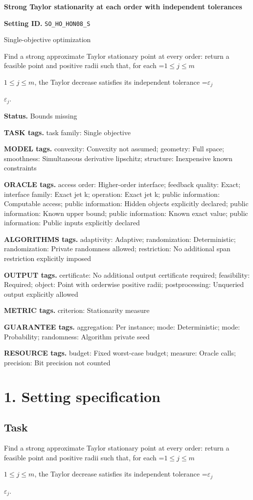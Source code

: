 \documentclass[10pt,a4paper]{article}
\newcommand{\AtlasMath}[1]{\par\begingroup\centering\setbox0=\hbox{$\displaystyle #1$}\ifdim\wd0>1.4\linewidth\typeout{ATLAS WIDE FORMULA: \the\wd0}\fi\ifdim\wd0>\linewidth\resizebox{\linewidth}{!}{\box0}\else\box0\fi\par\endgroup}
\newcommand{\AtlasInlineMath}[1]{\begingroup\setbox0=\hbox{$#1$}\ifdim\wd0>.4\linewidth\endgroup\AtlasMath{#1}\else\endgroup$#1$\fi}
\begin{document}
\raggedright

{\LARGE\bfseries\sffamily\color{AtlasNavy} Strong Taylor stationarity at each order with independent tolerances\par}\vspace{5pt}
\textbf{Setting ID.} \texttt{SO\_\allowbreak{}HO\_\allowbreak{}HON08\_\allowbreak{}S}

Single-objective optimization

Find a strong approximate Taylor stationary point at every order: return a feasible point and positive radii such that, for each \AtlasInlineMath{1\le j\le m}, the Taylor decrease satisfies its independent tolerance \AtlasInlineMath{\varepsilon_j}.

\textbf{Status.} Bounds missing

\textbf{TASK tags.} task family: Single objective

\textbf{MODEL tags.} convexity: Convexity not assumed; geometry: Full space; smoothness: Simultaneous derivative lipschitz; structure: Inexpensive known constraints

\textbf{ORACLE tags.} access order: Higher-order interface; feedback quality: Exact; interface family: Exact jet k; operation: Exact jet k; public information: Computable access; public information: Hidden objects explicitly declared; public information: Known upper bound; public information: Known exact value; public information: Public inputs explicitly declared

\textbf{ALGORITHMS tags.} adaptivity: Adaptive; randomization: Deterministic; randomization: Private randomness allowed; restriction: No additional span restriction explicitly imposed

\textbf{OUTPUT tags.} certificate: No additional output certificate required; feasibility: Required; object: Point with orderwise positive radii; postprocessing: Unqueried output explicitly allowed

\textbf{METRIC tags.} criterion: Stationarity measure

\textbf{GUARANTEE tags.} aggregation: Per instance; mode: Deterministic; mode: Probability; randomness: Algorithm private seed

\textbf{RESOURCE tags.} budget: Fixed worst-case budget; measure: Oracle calls; precision: Bit precision not counted

\section{1. Setting specification}
\subsection{Task}
Find a strong approximate Taylor stationary point at every order: return a feasible point and positive radii such that, for each \AtlasInlineMath{1\le j\le m}, the Taylor decrease satisfies its independent tolerance \AtlasInlineMath{\varepsilon_j}.
\end{document}

